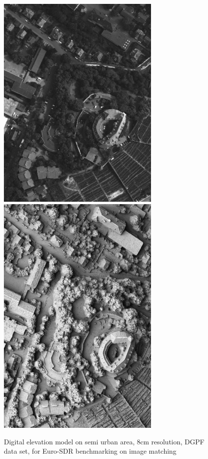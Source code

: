 \begin{figure}
\includegraphics[width=80mm]{FIGS/SAMPLES/DGPF_8Bits.jpg}
\includegraphics[width=80mm]{FIGS/SAMPLES/DGF-SHADE.jpg}
\caption{Digital elevation model on semi urban area, 8cm resolution, DGPF data set, for
Euro-SDR benchmarking on image matching}
\end{figure}


